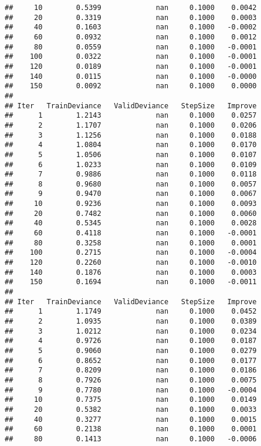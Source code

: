 \documentclass[]{article}
\begin{document}
\begin{verbatim}
##     10        0.5399             nan     0.1000    0.0042
##     20        0.3319             nan     0.1000    0.0003
##     40        0.1603             nan     0.1000   -0.0002
##     60        0.0932             nan     0.1000    0.0012
##     80        0.0559             nan     0.1000   -0.0001
##    100        0.0322             nan     0.1000   -0.0001
##    120        0.0189             nan     0.1000   -0.0001
##    140        0.0115             nan     0.1000   -0.0000
##    150        0.0092             nan     0.1000    0.0000
## 
## Iter   TrainDeviance   ValidDeviance   StepSize   Improve
##      1        1.2143             nan     0.1000    0.0257
##      2        1.1707             nan     0.1000    0.0206
##      3        1.1256             nan     0.1000    0.0188
##      4        1.0804             nan     0.1000    0.0170
##      5        1.0506             nan     0.1000    0.0107
##      6        1.0233             nan     0.1000    0.0109
##      7        0.9886             nan     0.1000    0.0118
##      8        0.9680             nan     0.1000    0.0057
##      9        0.9470             nan     0.1000    0.0067
##     10        0.9236             nan     0.1000    0.0093
##     20        0.7482             nan     0.1000    0.0060
##     40        0.5345             nan     0.1000    0.0028
##     60        0.4118             nan     0.1000   -0.0001
##     80        0.3258             nan     0.1000    0.0001
##    100        0.2715             nan     0.1000   -0.0004
##    120        0.2260             nan     0.1000   -0.0010
##    140        0.1876             nan     0.1000    0.0003
##    150        0.1694             nan     0.1000   -0.0011
## 
## Iter   TrainDeviance   ValidDeviance   StepSize   Improve
##      1        1.1749             nan     0.1000    0.0452
##      2        1.0935             nan     0.1000    0.0389
##      3        1.0212             nan     0.1000    0.0234
##      4        0.9726             nan     0.1000    0.0187
##      5        0.9060             nan     0.1000    0.0279
##      6        0.8652             nan     0.1000    0.0177
##      7        0.8209             nan     0.1000    0.0186
##      8        0.7926             nan     0.1000    0.0075
##      9        0.7780             nan     0.1000   -0.0004
##     10        0.7375             nan     0.1000    0.0149
##     20        0.5382             nan     0.1000    0.0033
##     40        0.3277             nan     0.1000    0.0015
##     60        0.2138             nan     0.1000    0.0001
##     80        0.1413             nan     0.1000   -0.0006

\end{verbatim}
\end{document}
